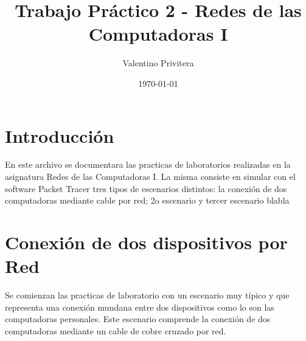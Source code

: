 \documentclass{article}
\title{\textbf{Trabajo Práctico 2 - Redes de las Computadoras I}}
\author{Valentino Privitera}
\date{\today}
\begin{document}
\maketitle


\section{Introducción}
En este archivo se documentara las practicas de laboratorios realizadas en la asignatura Redes de las Computadoras I. La misma consiste en simular con el software Packet Tracer tres tipos de escenarios distintos: la conexión de dos computadoras mediante cable por red; 2o escenario y tercer escenario blabla


\section{Conexión de dos dispositivos por Red}

Se comienzan las practicas de laboratorio con un escenario muy típico y que representa una conexión mundana entre dos dispositivos como lo son las computadoras personales. Este escenario comprende la conexión de dos computadoras mediante un cable de cobre cruzado por red. \\
\end{document}
